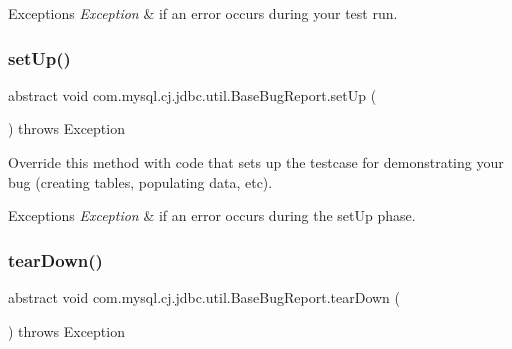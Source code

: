 \begin{DoxyExceptions}{Exceptions}
{\em Exception} & if an error occurs during your test run. \\
\hline
\end{DoxyExceptions}
\mbox{\label{classcom_1_1mysql_1_1cj_1_1jdbc_1_1util_1_1_base_bug_report_ad320a1b51efdb6c84a11050708d59d51}} 
\subsubsection{\texorpdfstring{set\+Up()}{setUp()}}
{\footnotesize\ttfamily abstract void com.\+mysql.\+cj.\+jdbc.\+util.\+Base\+Bug\+Report.\+set\+Up (\begin{DoxyParamCaption}{ }\end{DoxyParamCaption}) throws Exception\hspace{0.3cm}{\ttfamily [abstract]}}

Override this method with code that sets up the testcase for demonstrating your bug (creating tables, populating data, etc).


\begin{DoxyExceptions}{Exceptions}
{\em Exception} & if an error occurs during the \textquotesingle{}set\+Up\textquotesingle{} phase. \\
\hline
\end{DoxyExceptions}
\mbox{\label{classcom_1_1mysql_1_1cj_1_1jdbc_1_1util_1_1_base_bug_report_a425288fa4310585fc86c736ec94e8033}} 
\subsubsection{\texorpdfstring{tear\+Down()}{tearDown()}}
{\footnotesize\ttfamily abstract void com.\+mysql.\+cj.\+jdbc.\+util.\+Base\+Bug\+Report.\+tear\+Down (\begin{DoxyParamCaption}{ }\end{DoxyParamCaption}) throws Exception\hspace{0.3cm}{\ttfamily [abstract]}}

